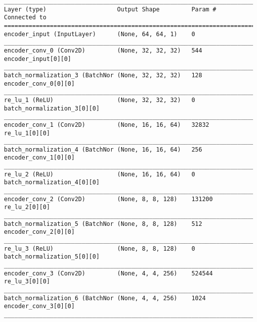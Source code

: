 \begin{lstlisting}[caption={\textsc{Mnist}-\ac{VAE}-\ac{GAN} Encoder},captionpos=b,basicstyle=\tiny, label={lst:mnist-vae-encoder}]
__________________________________________________________________________________________________
Layer (type)                    Output Shape         Param #     Connected to
==================================================================================================
encoder_input (InputLayer)      (None, 64, 64, 1)    0
__________________________________________________________________________________________________
encoder_conv_0 (Conv2D)         (None, 32, 32, 32)   544         encoder_input[0][0]
__________________________________________________________________________________________________
batch_normalization_3 (BatchNor (None, 32, 32, 32)   128         encoder_conv_0[0][0]
__________________________________________________________________________________________________
re_lu_1 (ReLU)                  (None, 32, 32, 32)   0           batch_normalization_3[0][0]
__________________________________________________________________________________________________
encoder_conv_1 (Conv2D)         (None, 16, 16, 64)   32832       re_lu_1[0][0]
__________________________________________________________________________________________________
batch_normalization_4 (BatchNor (None, 16, 16, 64)   256         encoder_conv_1[0][0]
__________________________________________________________________________________________________
re_lu_2 (ReLU)                  (None, 16, 16, 64)   0           batch_normalization_4[0][0]
__________________________________________________________________________________________________
encoder_conv_2 (Conv2D)         (None, 8, 8, 128)    131200      re_lu_2[0][0]
__________________________________________________________________________________________________
batch_normalization_5 (BatchNor (None, 8, 8, 128)    512         encoder_conv_2[0][0]
__________________________________________________________________________________________________
re_lu_3 (ReLU)                  (None, 8, 8, 128)    0           batch_normalization_5[0][0]
__________________________________________________________________________________________________
encoder_conv_3 (Conv2D)         (None, 4, 4, 256)    524544      re_lu_3[0][0]
__________________________________________________________________________________________________
batch_normalization_6 (BatchNor (None, 4, 4, 256)    1024        encoder_conv_3[0][0]
__________________________________________________________________________________________________

\end{lstlisting}
